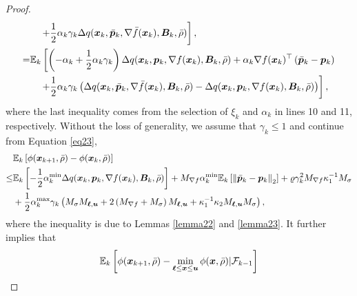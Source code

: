 \documentclass[aos]{imsart}
\numberwithin{equation}{section}
\theoremstyle{plain}
\begin{document}
\begin{appendix}
\begin{proof}
\begin{equation}
\begin{split}
            & \hspace{1em} \left.+ \frac{1}{2} \alpha_k \gamma_k \Delta q(\bm{x}_k,\Bar{\bm{p}}_k,\nabla \Bar{f}(\bm{x}_k),\bm{B}_k,\Bar{\rho})  \right], \\
            = & \mathbb{E}_k \left[ \left( - \alpha_k + \frac{1}{2} \alpha_k \gamma_k \right) \Delta q(\bm{x}_k,\bm{p}_k,\nabla f(\bm{x}_k),\bm{B}_k,\Bar{\rho})  + \alpha_k \nabla f(\bm{x}_k)^{\top} \left(\Bar{\bm{p}}_k - \bm{p}_k \right) \right.\\
            & \hspace{1em} \left.+ \frac{1}{2} \alpha_k \gamma_k \left( \Delta q(\bm{x}_k,\Bar{\bm{p}}_k,\nabla \Bar{f}(\bm{x}_k),\bm{B}_k,\Bar{\rho}) - \Delta q(\bm{x}_k,\bm{p}_k,\nabla f(\bm{x}_k),\bm{B}_k,\Bar{\rho}) \right)  \right], \\
        \end{split}
    \end{equation}
    where the last inequality comes from the selection of $\xi_k$ and $\alpha_k$ in lines 10 and 11, respectively. Without the loss of generality, we assume that $\gamma_k \leq 1$ and continue from Equation \eqref{eq23}, 
    \begin{equation*}
        \begin{split}
            & \mathbb{E}_k \left[ \phi(\bm{x}_{k+1},\Bar{\rho}) - \phi(\bm{x}_{k},\Bar{\rho}) \right] \\
            \leq & \mathbb{E}_k \left[ - \frac{1}{2} \alpha_k^{\text{min}}   \Delta q(\bm{x}_k,\bm{p}_k,\nabla f(\bm{x}_k),\bm{B}_k,\Bar{\rho}) \right] + M_{\nabla f} \alpha_k^{\text{min}} \mathbb{E}_k \left[ \left\|\Bar{\bm{p}}_k - \bm{p}_k \right\|_2 \right] + \varrho \gamma_k^2 M_{\nabla f} \kappa_1^{-1} M_{\sigma}  \\
            & + \frac{1}{2} \alpha_k^{\text{max}} \gamma_k \left( M_{\sigma} M_{\bm{\ell},\bm{u}} + 2 \left(M_{\nabla f} + M_{\sigma} \right) M_{\bm{\ell},\bm{u}} + \kappa_1^{-1} \kappa_2 M_{\bm{\ell},\bm{u}} M_{\sigma} \right),
        \end{split}
    \end{equation*}
    where the inequality is due to Lemmas \ref{lemma22} and \ref{lemma23}. It further implies that 
    \begin{equation}
    \label{eq24}
      \begin{split}
            & \mathbb{E}_k \left[ \phi(\bm{x}_{k+1},\Bar{\rho}) - \min_{\bm{\ell} \leq \bm{x} \leq \bm{u}}\phi(\bm{x},\Bar{\rho}) | \mathcal{F}_{k-1} \right]\\

\end{split}
\end{equation}
\end{proof}
\end{appendix}
\end{document}

